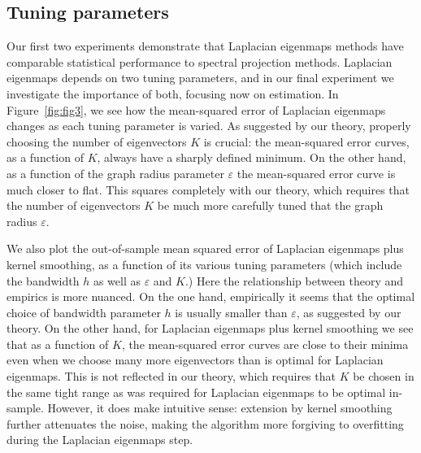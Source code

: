\documentclass[aos]{imsart}
\theoremstyle{plain}
\theoremstyle{definition}
\theoremstyle{remark}
\newcommand{\1}{\mathbf{1}}
\begin{document}
\subsection{Tuning parameters}
Our first two experiments demonstrate that Laplacian eigenmaps methods have comparable statistical performance to spectral projection methods. Laplacian eigenmaps depends on two tuning parameters, and in our final experiment we investigate the importance of both, focusing now on estimation. In Figure~\ref{fig:fig3}, we see how the mean-squared error of Laplacian eigenmaps changes as each tuning parameter is varied. As suggested by our theory, properly choosing the number of eigenvectors $K$ is crucial: the mean-squared error curves, as a function of $K$, always have a sharply defined minimum. On the other hand, as a function of the graph radius parameter $\varepsilon$ the mean-squared error curve is much closer to flat. This squares completely with our theory, which requires that the number of eigenvectors $K$ be much more carefully tuned that the graph radius $\varepsilon$.

We also plot the out-of-sample mean squared error of Laplacian eigenmaps plus kernel smoothing, as a function of its various tuning parameters (which include the bandwidth $h$ as well as $\varepsilon$ and $K$.) Here the relationship between theory and empirics is more nuanced. On the one hand, empirically it seems that the optimal choice of bandwidth parameter $h$ is usually smaller than $\varepsilon$, as suggested by our theory. On the other hand, for Laplacian eigenmaps plus kernel smoothing we see that as a function of $K$, the mean-squared error curves are close to their minima even when we choose many more eigenvectors than is optimal for Laplacian eigenmaps. This is not reflected in our theory, which requires that $K$ be chosen in the same tight range as was required for Laplacian eigenmaps to be optimal in-sample. However, it does make intuitive sense: extension by kernel smoothing further attenuates the noise, making the algorithm more forgiving to overfitting during the Laplacian eigenmaps step. 
\end{document}
